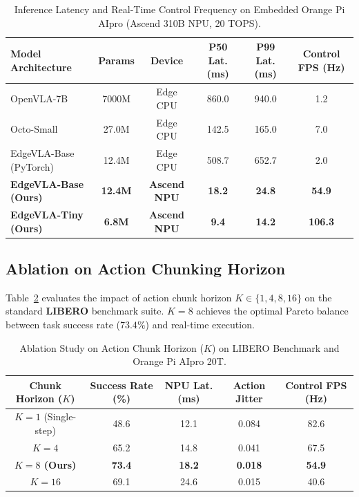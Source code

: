 \documentclass[lettersize,journal]{IEEEtran}
\begin{document}
\begin{table}[h]
\centering
\caption{Inference Latency and Real-Time Control Frequency on Embedded Orange Pi AIpro (Ascend 310B NPU, 20 TOPS).}
\label{tab:edge_vla_benchmark}
\begin{tabular}{lccccc}
\toprule
\textbf{Model Architecture} & \textbf{Params} & \textbf{Device} & \textbf{P50 Lat. (ms)} & \textbf{P99 Lat. (ms)} & \textbf{Control FPS (Hz)} \\
\midrule
OpenVLA-7B & 7000M & Edge CPU & 860.0 & 940.0 & 1.2 \\
Octo-Small & 27.0M & Edge CPU & 142.5 & 165.0 & 7.0 \\
EdgeVLA-Base (PyTorch) & 12.4M & Edge CPU & 508.7 & 652.7 & 2.0 \\
\textbf{EdgeVLA-Base (Ours)} & \textbf{12.4M} & \textbf{Ascend NPU} & \textbf{18.2} & \textbf{24.8} & \textbf{54.9} \\
\textbf{EdgeVLA-Tiny (Ours)} & \textbf{6.8M} & \textbf{Ascend NPU} & \textbf{9.4} & \textbf{14.2} & \textbf{106.3} \\
\bottomrule
\end{tabular}
\end{table}

\subsection{Ablation on Action Chunking Horizon}
Table~\ref{tab:ablation_chunk_size} evaluates the impact of action chunk horizon $K \in \{1, 4, 8, 16\}$ on the standard \textbf{LIBERO} benchmark suite. $K=8$ achieves the optimal Pareto balance between task success rate ($73.4\%$) and real-time execution.

\begin{table}[h]
\centering
\caption{Ablation Study on Action Chunk Horizon ($K$) on LIBERO Benchmark and Orange Pi AIpro 20T.}
\label{tab:ablation_chunk_size}
\begin{tabular}{ccccc}
\toprule
\textbf{Chunk Horizon ($K$)} & \textbf{Success Rate (\%)} & \textbf{NPU Lat. (ms)} & \textbf{Action Jitter} & \textbf{Control FPS (Hz)} \\
\midrule
$K=1$ (Single-step) & 48.6 & 12.1 & 0.084 & 82.6 \\
$K=4$ & 65.2 & 14.8 & 0.041 & 67.5 \\
\textbf{$K=8$ (Ours)} & \textbf{73.4} & \textbf{18.2} & \textbf{0.018} & \textbf{54.9} \\
$K=16$ & 69.1 & 24.6 & 0.015 & 40.6 \\
\bottomrule
\end{tabular}
\end{table}
\end{document}
